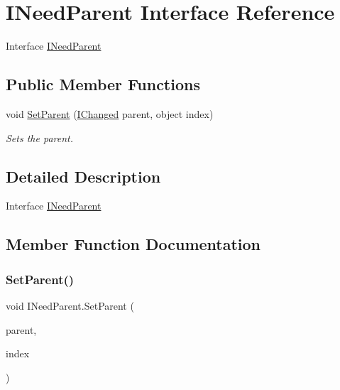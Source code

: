 \hypertarget{interface_i_need_parent}{}\section{I\+Need\+Parent Interface Reference}
\label{interface_i_need_parent}


Interface \hyperlink{interface_i_need_parent}{I\+Need\+Parent}  


\subsection*{Public Member Functions}
\begin{DoxyCompactItemize}
\item 
void \hyperlink{interface_i_need_parent_a5f0d3aafe8470eedf6039b3a6da82bec}{Set\+Parent} (\hyperlink{interface_i_changed}{I\+Changed} parent, object index)
\begin{DoxyCompactList}\small\item\em Sets the parent. \end{DoxyCompactList}\end{DoxyCompactItemize}


\subsection{Detailed Description}
Interface \hyperlink{interface_i_need_parent}{I\+Need\+Parent} 



\subsection{Member Function Documentation}
\mbox{\label{interface_i_need_parent_a5f0d3aafe8470eedf6039b3a6da82bec}} 
\subsubsection{\texorpdfstring{Set\+Parent()}{SetParent()}}
{\footnotesize\ttfamily void I\+Need\+Parent.\+Set\+Parent (\begin{DoxyParamCaption}\item[{\hyperlink{interface_i_changed}{I\+Changed}}]{parent,  }\item[{object}]{index }\end{DoxyParamCaption})}



